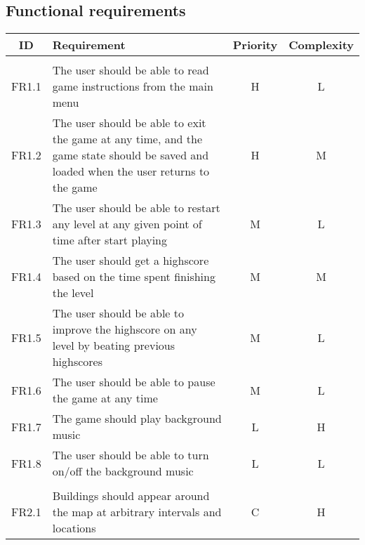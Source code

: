 \subsection{Functional requirements}



\begin{longtable}{| c | p{8cm} | c | c |}
	\hline
   	
   	\rowcolor{Black}
   	\bf{\color{white} ID} & \bf{\color{white}Requirement} & \bf{\color{white} Priority} & \bf{\color{white} Complexity} \\ \hline

   	\rowcolor{Gray}
   	\multicolumn{4}{| l |}{1) Basic functionality} \\ \hline

   	FR1.1 & The user should be able to read game instructions from the main menu & H & L \\ \hline

   	FR1.2 & The user should be able to exit the game at any time, and the game state should be saved and loaded when the user returns to the game & H & M \\ \hline

   	FR1.3 & The user should be able to restart any level at any given point of time after start playing & M & L \\ \hline

   	FR1.4 & The user should get a highscore based on the time spent finishing the level & M & M \\ \hline

   	FR1.5 & The user should be able to improve the highscore on any level by beating previous highscores & M & L \\ \hline

   	FR1.6 & The user should be able to pause the game at any time & M & L \\ \hline

   	FR1.7 & The game should play background music & L & H \\ \hline

 	FR1.8 & The user should be able to turn on/off the background music & L & L \\ \hline

 	\rowcolor{Gray}
   	\multicolumn{4}{| l |}{2) Building and Upgrade} \\ \hline

   	FR2.1 & Buildings should appear around the map at arbitrary intervals and locations & C & H \\ \hline


\end{longtable}
